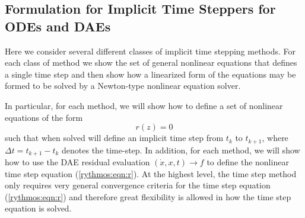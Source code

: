 \documentclass[pdf,ps2pdf,11pt]{SANDreport}
\begin{document}
\subsection{Formulation for Implicit Time Steppers for ODEs and DAEs}

Here we consider several different classes of implicit time stepping methods.
For each class of method we show the set of general nonlinear equations that
defines a single time step and then show how a linearized form of the
equations may be formed to be solved by a Newton-type nonlinear equation
solver.

In particular, for each method, we will show how to define a set of nonlinear
equations of the form
%
\begin{equation}
r(z) = 0
\label{rythmos:eqn:r}
\end{equation}
%
such that when solved will define an implicit time step from $t_k$ to
$t_{k+1}$, where $\Delta t = t_{k+1} - t_k$ denotes the time-step.  In
addition, for each method, we will show how to use the DAE residual evaluation
$(\dot{x},x,t) {}\rightarrow f$ to define the nonlinear time step equation
(\ref{rythmos:eqn:r}).  At the highest level, the time step method only
requires very general convergence criteria for the time step equation
(\ref{rythmos:eqn:r}) and therefore great flexibility is allowed in how the
time step equation is solved.
\end{document}
